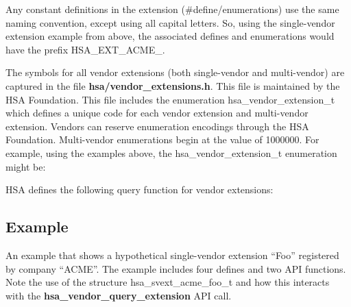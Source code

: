 \documentclass[final]{book}
\newcommand{\reffun}[1]{\textbf{#1}}
\newcommand{\reftyp}[1]{#1}
\newcommand{\refenu}[1]{\reftyp{#1}}
\begin{document}
Any constant definitions in the extension (\#define/enumerations) use the same
naming convention, except using all capital letters. So, using the single-vendor
extension example from above, the associated defines and enumerations would have
the prefix \refenu{HSA_EXT_ACME_}.

The symbols for all vendor extensions (both single-vendor and multi-vendor) are
captured in the file {\bf hsa/vendor_extensions.h}. This file is maintained by
the HSA Foundation. This file includes the enumeration
\reftyp{hsa_vendor_extension_t} which defines a unique code for each vendor
extension and multi-vendor extension. Vendors can reserve enumeration encodings
through the HSA Foundation. Multi-vendor enumerations begin at the value of
1000000. For example, using the examples above, the
\reftyp{hsa_vendor_extension_t} enumeration might be:



HSA defines the following query function for vendor extensions:



\subsection{Example}
An example that shows a hypothetical single-vendor extension ``Foo'' registered
by company ``ACME''. The example includes four defines and two API functions.
Note the use of the structure \reftyp{hsa_svext_acme_foo_t} and how this
interacts with the \reffun{hsa_vendor_query_extension} API call.


\end{document}
